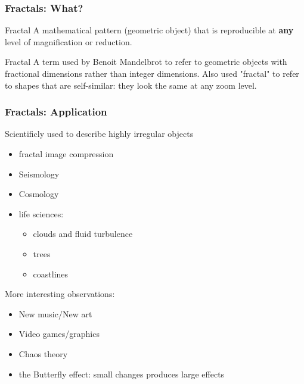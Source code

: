 \documentclass[10pt]{beamer}
\begin{document}
\begin{frame}
\frametitle{Fractals: What?}
\begin{definition}{Fractal}
A mathematical pattern (geometric object) that is reproducible at {\bf{any}}
level of magnification or reduction.
\end{definition}

\begin{definition}{Fractal}
A term used by Benoit Mandelbrot to refer to geometric objects with
fractional dimensions rather than integer dimensions.  Also used "fractal"
to refer to shapes that are self-similar: they look the same at any zoom
level.
\end{definition}
\end{frame}
\begin{frame}
\frametitle{Fractals: Application}
Scientificly used to describe highly irregular objects
\begin{itemize}
  \item fractal image compression
  \item Seismology
  \item Cosmology
  \item life sciences:
    \begin{itemize}
      \item clouds and fluid turbulence
      \item trees
      \item coastlines
    \end{itemize}
\end{itemize}
More interesting observations:
\begin{itemize}
  \item New music/New art
  \item Video games/graphics
  \item Chaos theory
  \item the Butterfly effect: small changes produces large effects
\end{itemize}
\end{frame}
\end{document}

